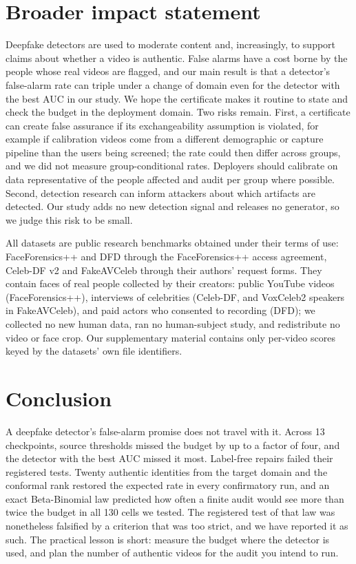\section*{Broader impact statement}
Deepfake detectors are used to moderate content and, increasingly, to support claims about whether a video is authentic. False alarms have a cost borne by the people whose real videos are flagged, and our main result is that a detector's false-alarm rate can triple under a change of domain even for the detector with the best AUC in our study. We hope the certificate makes it routine to state and check the budget in the deployment domain. Two risks remain. First, a certificate can create false assurance if its exchangeability assumption is violated, for example if calibration videos come from a different demographic or capture pipeline than the users being screened; the rate could then differ across groups, and we did not measure group-conditional rates. Deployers should calibrate on data representative of the people affected and audit per group where possible. Second, detection research can inform attackers about which artifacts are detected. Our study adds no new detection signal and releases no generator, so we judge this risk to be small.

All datasets are public research benchmarks obtained under their terms of use: FaceForensics++ and DFD through the FaceForensics++ access agreement, Celeb-DF v2 and FakeAVCeleb through their authors' request forms. They contain faces of real people collected by their creators: public YouTube videos (FaceForensics++), interviews of celebrities (Celeb-DF, and VoxCeleb2 speakers in FakeAVCeleb), and paid actors who consented to recording (DFD); we collected no new human data, ran no human-subject study, and redistribute no video or face crop. Our supplementary material contains only per-video scores keyed by the datasets' own file identifiers.

\section{Conclusion}
\label{sec:conclusion}
A deepfake detector's false-alarm promise does not travel with it. Across 13 checkpoints, source thresholds missed the budget by up to a factor of four, and the detector with the best AUC missed it most. Label-free repairs failed their registered tests. Twenty authentic identities from the target domain and the conformal rank restored the expected rate in every confirmatory run, and an exact Beta-Binomial law predicted how often a finite audit would see more than twice the budget in all 130 cells we tested. The registered test of that law was nonetheless falsified by a criterion that was too strict, and we have reported it as such. The practical lesson is short: measure the budget where the detector is used, and plan the number of authentic videos for the audit you intend to run.
